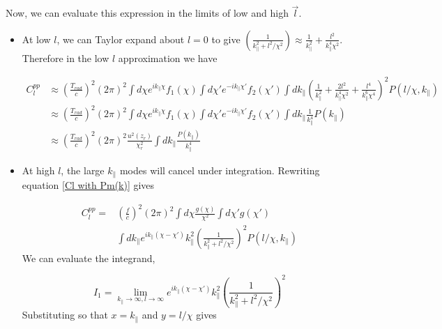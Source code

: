 \documentclass[12pt]{article}
\begin{document}
\noindent Now, we can evaluate this expression in the limits of low and high $\vec{l}$. \\
\begin{itemize}


\item At low $l$, we can Taylor expand about $l=0$ to give $\left(\frac{1}{k^2_\parallel+l^2/\chi^2}\right) \approx \frac{1}{k^2_\parallel}+\frac{l^2}{k^4_\parallel \chi^2}$.
Therefore in the low $l$ approximation we have

\begin{equation}\label{low ell limit}
\begin{aligned}
C_l^{pp}&
\approx\left(\frac{T_{rad} }{c}\right)^2 (2\pi)^2 \int d\chi e^{ik_{\parallel}\chi}f_1(\chi) \int d\chi' e^{-ik_{\parallel}\chi'}f_2(\chi')\int dk_\parallel \left(\frac{1}{k^2_\parallel}+\frac{2l^2}{k^4_\parallel \chi^2} + \frac{l^4}{k^6_\parallel \chi^4}\right)^2 P(l/\chi,k_\parallel)\\&
\approx\left(\frac{T_{rad}}{c}\right)^2 (2\pi)^2 \int d\chi e^{ik_{\parallel}\chi}f_1(\chi) \int d\chi' e^{-ik_{\parallel}\chi'}f_2(\chi')\int dk_\parallel \frac{1}{k^4_\parallel} P(k_\parallel)\\
&\approx\left(\frac{T_{rad} }{c}\right)^2 (2\pi)^2 \frac{u^2(z_r)}{\chi^2_r} \int dk_\parallel \frac{P(k_\parallel)}{k^4_\parallel}
\end{aligned}
\end{equation}

\item At high $l$, the large $k_\parallel$ modes will cancel under integration.
Rewriting equation \ref{Cl with Pm(k)} gives

\begin{equation}
\begin{aligned}
C_l^{pp}=&\left(\frac{f}{c}\right)^2 (2\pi)^2 \int d\chi \frac{g(\chi )}{\chi^2} \int d\chi' g(\chi' )\\
&\int dk_\parallel e^{ik_\parallel (\chi -\chi')}k^2_\parallel\left(\frac{1}{k^2_\parallel+l^2/\chi^2}\right)^2 P(l/\chi,k_\parallel)
\end{aligned}
\end{equation}
We can evaluate the integrand,

\begin{equation}
I_1=\lim_{k_\parallel \to \infty, l \to \infty} e^{ik_\parallel (\chi -\chi')}k^2_\parallel\left(\frac{1}{k^2_\parallel+l^2/\chi^2}\right)^2
\end{equation}
Substituting so that $x=k_\parallel$ and $y=l/\chi$ gives 


\end{itemize}
\end{document}
